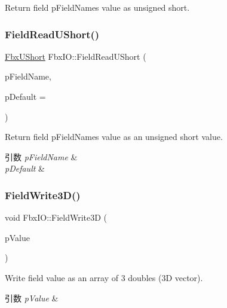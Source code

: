 Return field p\+Field\+Name\textquotesingle{}s value as unsigned short. 

\mbox{\label{class_fbx_i_o_a1a9c07675b3219fe21570575e6a0b0bd}} 
\subsubsection{\texorpdfstring{Field\+Read\+U\+Short()}{FieldReadUShort()}\hspace{0.1cm}{\footnotesize\ttfamily [2/2]}}
{\footnotesize\ttfamily \hyperlink{fbxtypes_8h_a321ef060885fc068fd77ac69a49f51d9}{Fbx\+U\+Short} Fbx\+I\+O\+::\+Field\+Read\+U\+Short (\begin{DoxyParamCaption}\item[{const char $\ast$}]{p\+Field\+Name,  }\item[{\hyperlink{fbxtypes_8h_a321ef060885fc068fd77ac69a49f51d9}{Fbx\+U\+Short}}]{p\+Default = {} }\end{DoxyParamCaption})}

Return field p\+Field\+Name\textquotesingle{}s value as an unsigned short value. 
\begin{DoxyParams}{引数}
{\em p\+Field\+Name} & \\
\hline
{\em p\+Default} & \\
\hline
\end{DoxyParams}
\mbox{\label{class_fbx_i_o_a660cf4cc58d7e8d9fd633904fef933b2}} 
\subsubsection{\texorpdfstring{Field\+Write3\+D()}{FieldWrite3D()}\hspace{0.1cm}{\footnotesize\ttfamily [1/2]}}
{\footnotesize\ttfamily void Fbx\+I\+O\+::\+Field\+Write3D (\begin{DoxyParamCaption}\item[{const double $\ast$}]{p\+Value }\end{DoxyParamCaption})}

Write field value as an array of 3 doubles (3D vector). 
\begin{DoxyParams}{引数}
{\em p\+Value} & \\
\hline
\end{DoxyParams}
\mbox{\label{class_fbx_i_o_a14449984a005d7a0dfa4aad0b67c193f}} 
